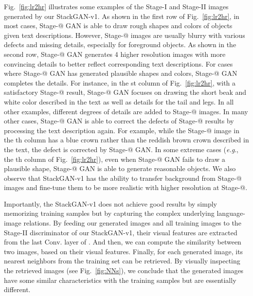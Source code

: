 \documentclass[10pt,journal,letterpaper,compsoc]{IEEEtran}
\makeatletter
\newcommand{\Rmnum}[1]{\expandafter\@slowromancap\romannumeral #1@}
\makeatother
\begin{document}
{Fig.~\ref{fig:lr2hr} illustrates some examples of the Stage-I and Stage-II images generated by our StackGAN-v1. As shown in the first row of Fig.~\ref{fig:lr2hr}, in most cases, Stage-\Rmnum{1} GAN is able to draw rough shapes and colors of objects given text descriptions. However, Stage-\Rmnum{1} images are usually blurry with various defects and missing details, especially for foreground objects. As shown in the second row, Stage-\Rmnum{2} GAN generates 4 higher resolution images with more convincing details to better reflect corresponding text descriptions. For cases where Stage-\Rmnum{1} GAN has generated plausible shapes and colors, Stage-\Rmnum{2} GAN completes the details. For instance, in the st column of Fig.~\ref{fig:lr2hr}, with a satisfactory Stage-\Rmnum{1} result, Stage-\Rmnum{2} GAN focuses on drawing the short beak and white color described in the text as well as details for the tail and legs. In all other examples, different degrees of details are added to Stage-\Rmnum{2} images. In many other cases, Stage-\Rmnum{2} GAN is able to correct the defects of Stage-\Rmnum{1} results by processing the text description again. For example, while the Stage-\Rmnum{1} image in the th column has a blue crown rather than the reddish brown crown described in the text, the defect is corrected by Stage-\Rmnum{2} GAN. In some extreme cases (\emph{e.g}., the th column of Fig.~\ref{fig:lr2hr}), even when Stage-\Rmnum{1} GAN fails to draw a plausible shape, Stage-\Rmnum{2} GAN is able to generate reasonable objects. We also observe that StackGAN-v1 has the ability to transfer background from Stage-\Rmnum{1} images and fine-tune them to be more realistic with higher resolution at Stage-\Rmnum{2}.


Importantly, the StackGAN-v1 does not achieve good results by simply memorizing training samples but by capturing the complex underlying language-image relations. By feeding our generated images and all training images to the Stage-II discriminator  of our StackGAN-v1, their visual features are extracted from the last Conv. layer of . And then, we can compute the similarity between two images, based on their visual features. Finally, for each generated image, its nearest neighbors from the training set can be retrieved. By visually inspecting the retrieved images (see Fig.~\ref{fig:NNs}), we conclude that the generated images have some similar characteristics with the training samples but are essentially different. 
}
\end{document}
